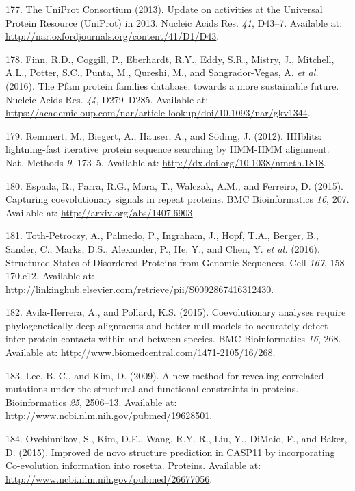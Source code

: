 \documentclass[11pt,a4paper,twoside]{book}
\theoremstyle{definition}
\theoremstyle{definition}
\theoremstyle{remark}
\begin{document}
\hypertarget{ref-TheUniProtConsortium2013}{}
177. The UniProt Consortium (2013). Update on activities at the
Universal Protein Resource (UniProt) in 2013. Nucleic Acids Res.
\emph{41}, D43--7. Available at:
\url{http://nar.oxfordjournals.org/content/41/D1/D43}.

\hypertarget{ref-Finn2016}{}
178. Finn, R.D., Coggill, P., Eberhardt, R.Y., Eddy, S.R., Mistry, J.,
Mitchell, A.L., Potter, S.C., Punta, M., Qureshi, M., and
Sangrador-Vegas, A. \emph{et al.} (2016). The Pfam protein families
database: towards a more sustainable future. Nucleic Acids Res.
\emph{44}, D279--D285. Available at:
\url{https://academic.oup.com/nar/article-lookup/doi/10.1093/nar/gkv1344}.

\hypertarget{ref-Remmert2012}{}
179. Remmert, M., Biegert, A., Hauser, A., and Söding, J. (2012).
HHblits: lightning-fast iterative protein sequence searching by HMM-HMM
alignment. Nat. Methods \emph{9}, 173--5. Available at:
\url{http://dx.doi.org/10.1038/nmeth.1818}.

\hypertarget{ref-Espada2014}{}
180. Espada, R., Parra, R.G., Mora, T., Walczak, A.M., and Ferreiro, D.
(2015). Capturing coevolutionary signals in repeat proteins. BMC
Bioinformatics \emph{16}, 207. Available at:
\url{http://arxiv.org/abs/1407.6903}.

\hypertarget{ref-Toth-Petroczy2016}{}
181. Toth-Petroczy, A., Palmedo, P., Ingraham, J., Hopf, T.A., Berger,
B., Sander, C., Marks, D.S., Alexander, P., He, Y., and Chen, Y.
\emph{et al.} (2016). Structured States of Disordered Proteins from
Genomic Sequences. Cell \emph{167}, 158--170.e12. Available at:
\url{http://linkinghub.elsevier.com/retrieve/pii/S0092867416312430}.

\hypertarget{ref-Avila-Herrera2015a}{}
182. Avila-Herrera, A., and Pollard, K.S. (2015). Coevolutionary
analyses require phylogenetically deep alignments and better null models
to accurately detect inter-protein contacts within and between species.
BMC Bioinformatics \emph{16}, 268. Available at:
\url{http://www.biomedcentral.com/1471-2105/16/268}.

\hypertarget{ref-Lee2009}{}
183. Lee, B.-C., and Kim, D. (2009). A new method for revealing
correlated mutations under the structural and functional constraints in
proteins. Bioinformatics \emph{25}, 2506--13. Available at:
\url{http://www.ncbi.nlm.nih.gov/pubmed/19628501}.

\hypertarget{ref-Ovchinnikov2015b}{}
184. Ovchinnikov, S., Kim, D.E., Wang, R.Y.-R., Liu, Y., DiMaio, F., and
Baker, D. (2015). Improved de novo structure prediction in CASP11 by
incorporating Co-evolution information into rosetta. Proteins. Available
at: \url{http://www.ncbi.nlm.nih.gov/pubmed/26677056}.
\end{document}
